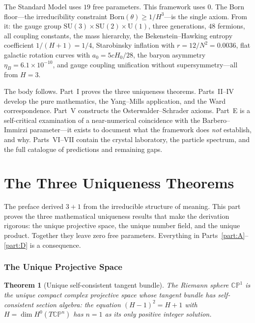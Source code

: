 \documentclass[11pt,a4paper]{article}
\newtheorem{theorem}{Theorem}[section]
\theoremstyle{definition}
\theoremstyle{remark}
\newcommand{\CP}{\mathbb{CP}}
\newcommand{\SU}{\mathrm{SU}}
\begin{document}
The Standard Model uses $19$ free parameters. This framework uses $0$. The Born floor---the irreducibility constraint $\mathrm{Born}(\theta)\geq 1/H^3$---is the single axiom. From it: the gauge group $\SU(3)\times\SU(2)\times\mathrm{U}(1)$, three generations, $48$ fermions, all coupling constants, the mass hierarchy, the Bekenstein--Hawking entropy coefficient $1/(H+1)=1/4$, Starobinsky inflation with $r=12/N^2=0.0036$, flat galactic rotation curves with $a_0=5cH_0/28$, the baryon asymmetry $\eta_B=6.1\times 10^{-10}$, and gauge coupling unification without supersymmetry---all from $H=3$.

\bigskip

The body follows. Part~I proves the three uniqueness theorems. Parts~II--IV develop the pure mathematics, the Yang--Mills application, and the Ward correspondence. Part~V constructs the Osterwalder--Schrader axioms. Part~E is a self-critical examination of a near-numerical coincidence with the Barbero--Immirzi parameter---it exists to document what the framework does \emph{not} establish, and why. Parts~VI--VII contain the crystal laboratory, the particle spectrum, and the full catalogue of predictions and remaining gaps.

\newpage

\part{The Three Uniqueness Theorems}\label{part:bridge}

The preface derived $3+1$ from the irreducible structure of meaning. This part proves the three mathematical uniqueness results that make the derivation rigorous: the unique projective space, the unique number field, and the unique product. Together they leave zero free parameters. Everything in Parts~\ref{part:A}--\ref{part:D} is a consequence.

\section{The Unique Projective Space}\label{sec:unique_space}

\begin{theorem}[Unique self-consistent tangent bundle]\label{thm:unique_cpn}
The Riemann sphere $\CP^1$ is the unique compact complex projective space whose tangent bundle has self-consistent section algebra: the equation $(H-1)^2=H+1$ with $H=\dim H^0(T\CP^n)$ has $n=1$ as its only positive integer solution.
\end{theorem}
\end{document}

